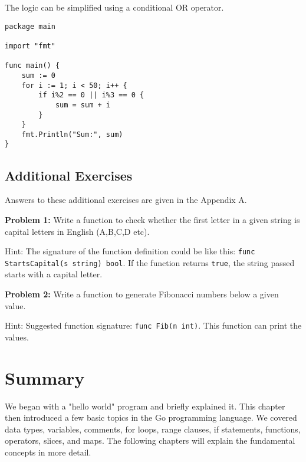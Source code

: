 The logic can be simplified using a conditional OR operator.

\begin{lstlisting}[numbers=none]
package main

import "fmt"

func main() {
    sum := 0
    for i := 1; i < 50; i++ {
        if i%2 == 0 || i%3 == 0 {
            sum = sum + i
        }
    }
    fmt.Println("Sum:", sum)
}
\end{lstlisting}

\subsection{Additional Exercises}

Answers to these additional exercises are given in the Appendix A.

\textbf{Problem 1:} Write a function to check whether the first letter in a
given string is capital letters in English (A,B,C,D etc).

Hint: The signature of the function definition could be like this:
\texttt{func StartsCapital(s string) bool}.  If the function returns
\texttt{true}, the string passed starts with a capital letter.

\textbf{Problem 2:} Write a function to generate Fibonacci numbers below a
given value.

Hint: Suggested function signature: \texttt{func Fib(n int)}.  This
function can print the values.

\section*{Summary}

We began with a "hello world" program and briefly explained it. This chapter
then introduced a few basic topics in the Go programming language. We covered
data types, variables, comments, for loops, range clauses, if statements,
functions, operators, slices, and maps. The following chapters will explain the
fundamental concepts in more detail.

